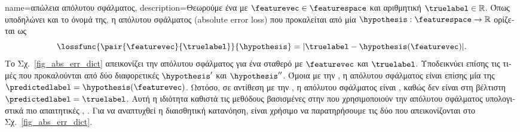 {name={\foreignlanguage{greek}{απώλεια απόλυτου σφάλματος}},
	description={\foreignlanguage{greek}{Θεωρούμε ένα}  \foreignlanguage{greek}{με}  
		$\featurevec \in \featurespace$ \foreignlanguage{greek}{και αριθμητική}  $\truelabel \in \mathbb{R}$. 
		\foreignlanguage{greek}{Όπως υποδηλώνει και το όνομά της, η}  \foreignlanguage{greek}{απόλυτου 
		σφάλματος} (absolute error loss)
		\foreignlanguage{greek}{που προκαλείται από μία}  $\hypothesis: \featurespace \rightarrow \mathbb{R}$ 
		\foreignlanguage{greek}{ορίζεται ως} $$\lossfunc{\pair{\featurevec}{\truelabel}}{\hypothesis} = |\truelabel - \hypothesis(\featurevec)|.$$
		\foreignlanguage{greek}{Το Σχ.}\ \ref{fig_abs_err_dict} \foreignlanguage{greek}{απεικονίζει την}  
		\foreignlanguage{greek}{απόλυτου σφάλματος για ένα σταθερό}  \foreignlanguage{greek}{με} 
		 $\featurevec$ \foreignlanguage{greek}{και}  $\truelabel$. 
		\foreignlanguage{greek}{Υποδεικνύει επίσης τις τιμές}  \foreignlanguage{greek}{που προκαλούνται 
		από δύο διαφορετικές}  $\hypothesis'$ \foreignlanguage{greek}{και} $\hypothesis''$. 
		\foreignlanguage{greek}{Όμοια με την} , \foreignlanguage{greek}{η}  
		\foreignlanguage{greek}{απόλυτου σφάλματος είναι επίσης μία}   
		\foreignlanguage{greek}{της}  $\predictedlabel=\hypothesis(\featurevec)$. 
		\foreignlanguage{greek}{Ωστόσο, σε αντίθεση με την} , \foreignlanguage{greek}{η}  
		\foreignlanguage{greek}{απόλυτου σφάλματος είναι} , \foreignlanguage{greek}{καθώς δεν είναι}  
		 \foreignlanguage{greek}{στη βέλτιστη}  $\predictedlabel=\truelabel$. 
		\foreignlanguage{greek}{Αυτή η ιδιότητα καθιστά τις μεθόδους βασισμένες στην}  
		\foreignlanguage{greek}{που χρησιμοποιούν την}  \foreignlanguage{greek}{απόλυτου σφάλματος 
		υπολογιστικά πιο απαιτητικές} \cite{nesterov04}, \cite{OptMLBook}. 
	    	\foreignlanguage{greek}{Για να αναπτυχθεί η διαισθητική κατανόηση, είναι χρήσιμο να παρατηρήσουμε τις δύο} 
		 \foreignlanguage{greek}{που απεικονίζονται στο Σχ.}\ \ref{fig_abs_err_dict}. 
}}
